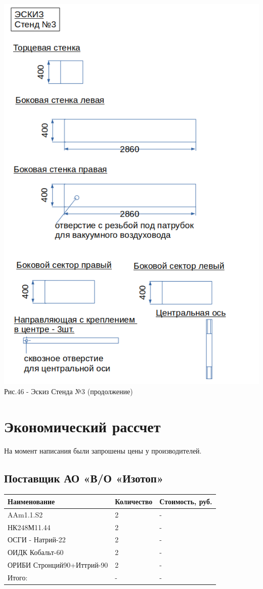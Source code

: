 \documentclass[11pt]{report}
\begin{document}
\includegraphics[scale=0.7]{stend_3_2}\\
Рис.46 - Эскиз Стенда №3 (продолжение)\\

\section{Экономический рассчет}
На момент написания были запрошены цены у производителей. \\

\subsection{Поставщик АО «В/О «Изотоп»}

\begin{tabular}{|p{5.5cm}|p{3.0cm}|p{3cm}|}
\hline
	Наименование & Количество & Стоимость, руб. \\
\hline
	AAm1.1.S2  & 2 & - \\
\hline
	НК248М11.44  & 2 & - \\
\hline	
	ОСГИ - Натрий-22  & 2 & - \\
\hline
	ОИДК Кобальт-60  & 2 & - \\
\hline
	ОРИБИ Стронций90+Иттрий-90  & 2 & - \\
\hline
	Итого:  & - & - \\
\hline
\end{tabular}
\end{document}

